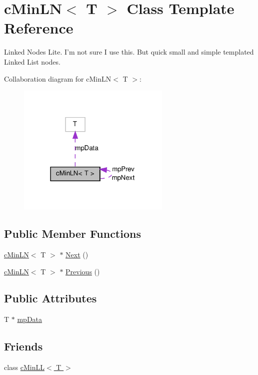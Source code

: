 \hypertarget{classc_min_l_n}{
\section{cMinLN$<$ T $>$ Class Template Reference}
\label{classc_min_l_n}
}


Linked Nodes Lite. I'm not sure I use this. But quick small and simple templated Linked List nodes.  




Collaboration diagram for cMinLN$<$ T $>$:
\nopagebreak
\begin{figure}[H]
\begin{center}
\leavevmode
\includegraphics[width=207pt]{classc_min_l_n__coll__graph}
\end{center}
\end{figure}
\subsection*{Public Member Functions}
\begin{DoxyCompactItemize}
\item 
\hyperlink{classc_min_l_n}{cMinLN}$<$ T $>$ $\ast$ \hyperlink{classc_min_l_n_a2f0f06a9c080bd895180aacd5862384a}{Next} ()
\item 
\hyperlink{classc_min_l_n}{cMinLN}$<$ T $>$ $\ast$ \hyperlink{classc_min_l_n_a629b32a7e877d1632057545bad0482b5}{Previous} ()
\end{DoxyCompactItemize}
\subsection*{Public Attributes}
\begin{DoxyCompactItemize}
\item 
T $\ast$ \hyperlink{classc_min_l_n_a59b83cefc712458b2200a6560711c8c1}{mpData}
\end{DoxyCompactItemize}
\subsection*{Friends}
\begin{DoxyCompactItemize}
\item 
class \hyperlink{classc_min_l_n_afe8a889f8a2d6d0d7ff40bcf4dcbc024}{cMinLL$<$ T $>$}
\end{DoxyCompactItemize}


